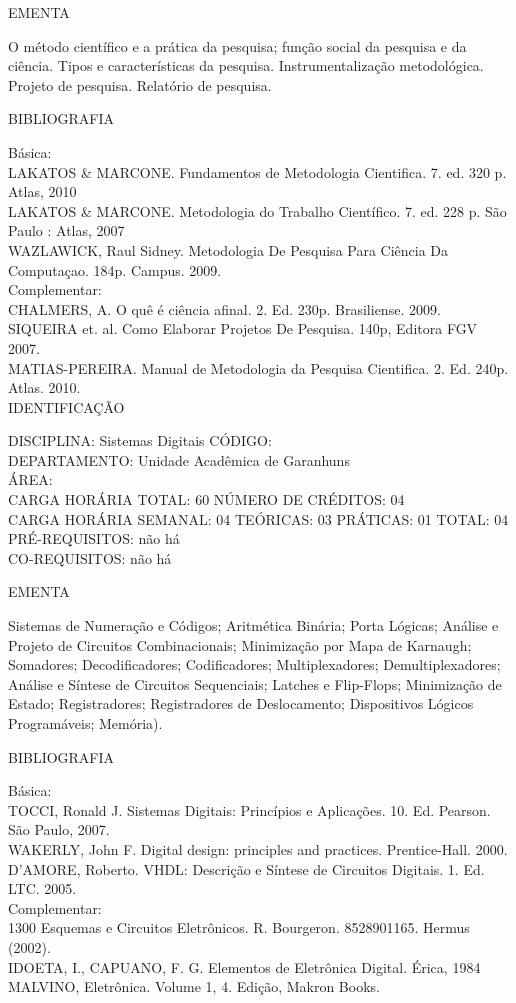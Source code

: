 \documentclass[
	12pt,				%
	openright,			%
  oneside,     %
	a4paper,			%
	chapter=TITLE,		%
	english,			%
	french,				%
	spanish,			%
	brazil				%
	]{abntex2}
\begin{document}
\begin{apendicesenv}
EMENTA 

O método científico e a prática da pesquisa; função social da pesquisa e
da ciência. Tipos e características da pesquisa. Instrumentalização
metodológica. Projeto de pesquisa. Relatório de pesquisa.

BIBLIOGRAFIA 

Básica:\\
LAKATOS \& MARCONE. Fundamentos de Metodologia Cientifica. 7. ed. 320 p.
Atlas, 2010\\
LAKATOS \& MARCONE. Metodologia do Trabalho Científico. 7. ed. 228 p.
São Paulo : Atlas, 2007\\
WAZLAWICK, Raul Sidney. Metodologia De Pesquisa Para Ciência Da
Computaçao. 184p. Campus. 2009.\\
Complementar:\\
CHALMERS, A. O quê é ciência afinal. 2. Ed. 230p. Brasiliense. 2009.\\
SIQUEIRA et. al. Como Elaborar Projetos De Pesquisa. 140p, Editora FGV
2007.\\
MATIAS-PEREIRA. Manual de Metodologia da Pesquisa Cientifica. 2. Ed.
240p. Atlas. 2010.\\

\newpage IDENTIFICAÇÃO

DISCIPLINA: Sistemas Digitais CÓDIGO:\\ 
DEPARTAMENTO: Unidade Acadêmica de Garanhuns\\
ÁREA: \\
CARGA HORÁRIA TOTAL: 60 NÚMERO DE CRÉDITOS: 04\\
CARGA HORÁRIA SEMANAL: 04 TEÓRICAS: 03 PRÁTICAS: 01 TOTAL: 04\\
PRÉ-REQUISITOS: não há\\
CO-REQUISITOS: não há

EMENTA 

Sistemas de Numeração e Códigos; Aritmética Binária; Porta Lógicas;
Análise e Projeto de Circuitos Combinacionais; Minimização por Mapa de
Karnaugh; Somadores; Decodificadores; Codificadores; Multiplexadores;
Demultiplexadores; Análise e Síntese de Circuitos Sequenciais; Latches
e Flip-Flops; Minimização de Estado; Registradores; Registradores de
Deslocamento; Dispositivos Lógicos Programáveis; Memória).

BIBLIOGRAFIA 

Básica:\\
TOCCI, Ronald J. Sistemas Digitais: Princípios e Aplicações. 10. Ed.
Pearson. São Paulo, 2007.\\
WAKERLY, John F. Digital design: principles and practices.
Prentice-Hall. 2000. D'AMORE, Roberto. VHDL: Descrição
e Síntese de Circuitos Digitais. 1. Ed. LTC. 2005.\\
Complementar:\\
1300 Esquemas e Circuitos Eletrônicos. R. Bourgeron. 8528901165. Hermus
(2002).\\
IDOETA, I., CAPUANO, F. G. Elementos de Eletrônica Digital. Érica, 1984\\
MALVINO, Eletrônica. Volume 1, 4. Edição, Makron Books.\\



\end{apendicesenv}
\end{document}
